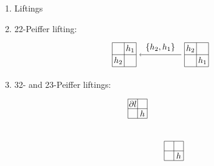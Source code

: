 \documentclass[11pt, reqno]{amsart} %
\newcommand{\act}[1]{\,\sp{#1}\!}
\newcommand{\strrect}[3][]{
  \begin{scope}[every node/.append style={overlay},#1]
    \foreach \x [count=\i] in {#3}{
      \ifx\x\empty
      \else
        \pgfmathsetmacro{\modResult}{mod(\i-1, #2)}
        \pgfmathsetmacro{\quotResult}{(\i-\modResult-1)/#2}
        \node at (\modResult,-\quotResult) {\x};
      \fi
    }
    \foreach \x in {0,1,...,#2}{
      \draw ({-1/2+\x},{1/2})--({-1/2+\x},{-#2+1/2});
      \draw ({-1/2},{1/2-\x})--({#2-1/2},{1/2-\x});
    }
  \end{scope}
}
\theoremstyle{definition}
\theoremstyle{remark}
\numberwithin{equation}{section}
\begin{document}
\begin{enumerate}
\begin{align}
\begin{tikzpicture}[baseline=(T.base)]
      \draw [thick,->,bend right=1.5cm] (A) to node [fill=white] (C) {$l_2l_1$} (B);
      \draw [thick,->,bend left=1.5cm] (A) to node [fill=white] (D) {$l_2l_1'$} (B);
      \path (C) to node {$\Downarrow \act{l_2}m_1$} (D);
    \end{tikzpicture}, \\
    \begin{tikzpicture}[baseline=(T.base)]
      \node (A) at (2,0) {\tikz{\strrect[thick,scale=.5]{1}{$h$}}};
      \node (B) at (0,0) {\tikz{\strrect[thick,scale=.5]{1}{$h'$}}};
      \node (C) at (-2,0) {\tikz{\strrect[thick,scale=.5]{1}{$h''$}}};
      \draw [thick,->] (A) to node [anchor=south] {$l_1$} (B);
      \draw [thick,->,bend right=1.5cm] (B) to node [fill=white] (A) {$l_2$} (C);
      \draw [thick,->,bend left=1.5cm] (B) to node [fill=white] (D) {$l_2'$} (C);
      \path (A) to node {$\Downarrow m_2$} (D);
    \end{tikzpicture}
    &=
    \begin{tikzpicture}[baseline=(T.base)]
      \node (A) at (1.5,0) {\tikz{\strrect[thick,scale=.5]{1}{$h$}}};
      \node (B) at (-1.5,0) {\tikz{\strrect[thick,scale=.5]{1}{$h''$}}};
      \draw [thick,->,bend right=1.5cm] (A) to node [fill=white] (C) {$l_2l_1$} (B);
      \draw [thick,->,bend left=1.5cm] (A) to node [fill=white] (D) {$l_2'l_1$} (B);
      \path (C) to node {$\Downarrow m_2$} (D);
    \end{tikzpicture},
  \end{align}
  where $m_2,m_1\in M$, $l_2,l_1,l_2'=\partial(m_2)l_2,l_1'=\partial(m_1)l_1\in L$ and $h,h':=\partial(l_1)m,h'':=\partial(l_2)h'\in H$. 
  \item Liftings
  \item [$\bullet$] 22-Peiffer lifting:
  \[
    \begin{tikzpicture}[baseline=-2pt]
      \node (A) at (1.5,0) {\tikz[baseline=-2pt,scale=.5]{\strrect{2}{$h_2$,,,$h_1$}}};
      \node (B) at (-1.5,0) {\tikz[baseline=-2pt,scale=.5]{\strrect{2}{,$h_1$,$h_2$,}}};
      \draw [->] (A) to node [anchor=south] {$\{h_2,h_1\}$} (B);
    \end{tikzpicture}
  \]
  \item [$\bullet$] 32- and 23-Peiffer liftings:
  \begin{align}
    \nonumber
    &
    \begin{tikzpicture}[baseline=-2pt]
      \node (A) at (1.5,0) {\tikz[baseline=-2pt,scale=.4]{\strrect{2}{,,,$h$}}};
      \node (B) at (0,1.75) {\tikz[baseline=-2pt,scale=.4]{\strrect{2}{$\partial l$,,,$h$}}};

\end{tikzpicture}
\end{align}
\end{enumerate}
\end{document}
